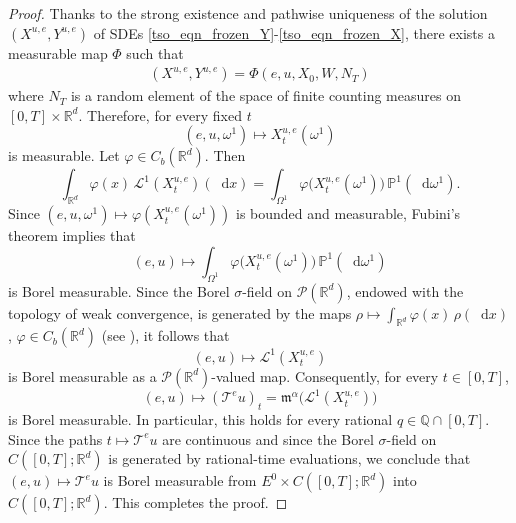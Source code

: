 \documentclass{article}
\def\R{\mathbb{R}}
\def\m{\mathfrak{m}}
\newcommand*\der{\mathop{}\!\mathrm{d}}
\numberwithin{equation}{section}
\begin{document}
\begin{proof}
    Thanks to the strong existence and pathwise uniqueness of the solution $(X^{u,e},Y^{u,e})$ of SDEs \eqref{tso_eqn_frozen_Y}-\eqref{tso_eqn_frozen_X}, there exists a measurable map $\Phi$ such that
    \begin{align}
        (X^{u,e}, Y^{u,e}) = \Phi(e, u, X_0, W, N_T)
    \end{align}
     where $N_T$ is a random element of the space of finite counting measures on $[0,T] \times \R^d$. Therefore, for every fixed $t$
\begin{equation*}
    (e, u, \omega^1) \longmapsto X_{t}^{u,e}(\omega^1)
\end{equation*}
     is measurable. Let $\varphi \in C_b(\R^d)$. Then
\begin{equation}
    \int_{\R^d}\varphi(x)\,
    \mathcal{L}^1(X_t^{u,e})(\der x)
    =     \int_{\Omega^1}
    \varphi\bigl(X_t^{u,e}(\omega^1)\bigr)
    \,\mathbb{P}^1(\der \omega^1).
\end{equation}
Since $(e,u,\omega^1)
    \longmapsto
    \varphi(X_t^{u,e}(\omega^1))$
is bounded and measurable, Fubini's theorem implies that
\begin{equation*}
    (e,u)
    \longmapsto     \int_{\Omega^1}
    \varphi\bigl(X_t^{u,e}(\omega^1)\bigr)
    \,\mathbb P^1(\der \omega^1)
\end{equation*}
is Borel measurable. Since the Borel $\sigma$-field on $\mathcal P(\mathbb R^d)$, endowed with the topology of weak convergence, is
 generated by the maps $ \rho\longmapsto \int_{\mathbb R^d}\varphi(x)\,\rho(\der x)$, $\varphi\in C_b(\mathbb R^d)$ (see \cite[Chapter~6]{parthasarathy2005probability}), 
it follows that
\[
    (e,u)\longmapsto \mathcal{L}^1(X_t^{u,e})
\]
is Borel measurable as a $\mathcal P(\mathbb R^d)$-valued map. Consequently, for every $t\in[0,T]$,
\begin{equation*}
    (e,u)
    \longmapsto  (\mathcal T^e u)_t
    =  \m^\alpha\bigl(\mathcal{L}^1(X_t^{u,e})\bigr)
\end{equation*}
is Borel measurable. In particular, this holds for every rational
$q\in\mathbb{Q}\cap[0,T]$. Since the paths $t\mapsto \mathcal{T}^e u$ are
continuous and since the Borel $\sigma$-field on
$C([0,T];\mathbb R^d)$ is generated by rational-time evaluations, we conclude
that $(e,u)\longmapsto \mathcal T^e u$
is Borel measurable from $E^0\times C([0,T];\mathbb R^d)$ into $C([0,T];\mathbb R^d)$. 
This completes the proof.
     
\end{proof}
\end{document}
